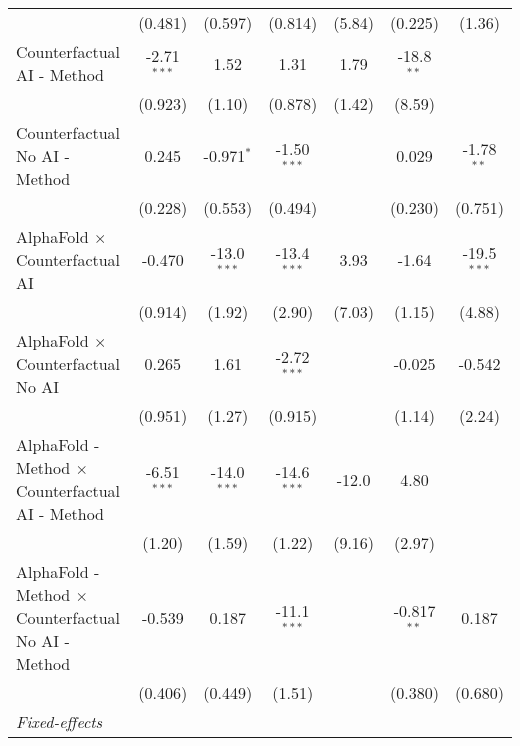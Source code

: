 \begin{tabular}{lcccccc}
                                                              & (0.481)       & (0.597)       & (0.814)       & (5.84)        & (0.225)        & (1.36)\\   
   Counterfactual AI - Method                                 & -2.71$^{***}$ & 1.52          & 1.31          & 1.79          & -18.8$^{**}$   &   \\   
                                                              & (0.923)       & (1.10)        & (0.878)       & (1.42)        & (8.59)         &   \\   
   Counterfactual No AI - Method                              & 0.245         & -0.971$^{*}$  & -1.50$^{***}$ &               & 0.029          & -1.78$^{**}$\\   
                                                              & (0.228)       & (0.553)       & (0.494)       &               & (0.230)        & (0.751)\\   
   AlphaFold $\times$ Counterfactual AI                       & -0.470        & -13.0$^{***}$ & -13.4$^{***}$ & 3.93          & -1.64          & -19.5$^{***}$\\   
                                                              & (0.914)       & (1.92)        & (2.90)        & (7.03)        & (1.15)         & (4.88)\\   
   AlphaFold $\times$ Counterfactual No AI                    & 0.265         & 1.61          & -2.72$^{***}$ &               & -0.025         & -0.542\\   
                                                              & (0.951)       & (1.27)        & (0.915)       &               & (1.14)         & (2.24)\\   
   AlphaFold - Method $\times$ Counterfactual AI - Method     & -6.51$^{***}$ & -14.0$^{***}$ & -14.6$^{***}$ & -12.0         & 4.80           &   \\   
                                                              & (1.20)        & (1.59)        & (1.22)        & (9.16)        & (2.97)         &   \\   
   AlphaFold - Method $\times$ Counterfactual No AI - Method  & -0.539        & 0.187         & -11.1$^{***}$ &               & -0.817$^{**}$  & 0.187\\   
                                                              & (0.406)       & (0.449)       & (1.51)        &               & (0.380)        & (0.680)\\   
   \midrule
   \emph{Fixed-effects}\\

\end{tabular}
